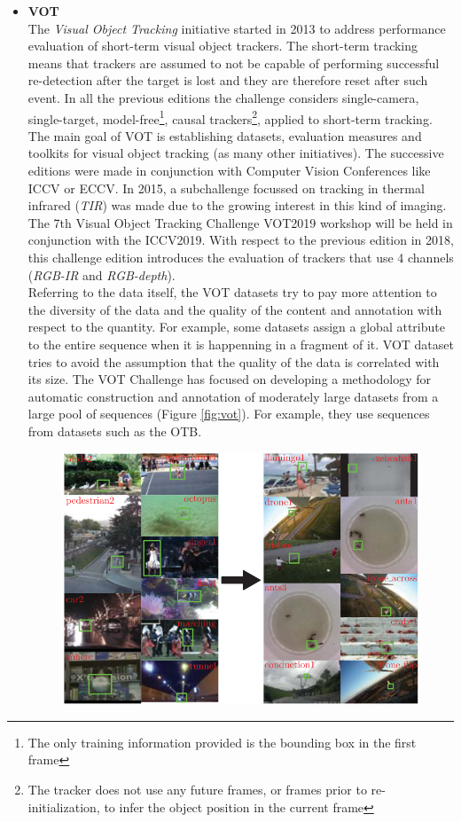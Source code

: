 \begin{itemize}
\item \textbf{VOT} \cite{kristan2017visual}\\
The \textit{Visual Object Tracking} initiative started in 2013 to address performance evaluation of short-term visual object trackers. The short-term tracking means that trackers are assumed to not be capable of performing successful re-detection after the target is lost and they are therefore reset after such event. In all the previous editions the challenge considers single-camera, single-target, model-free\footnote{The only training information provided is the bounding box in the first frame}, causal trackers\footnote{The tracker does not use any future frames, or frames prior to re-initialization, to infer the object position in the current frame}, applied to short-term tracking. The main goal of VOT is establishing datasets, evaluation measures and toolkits for visual object tracking (as many other initiatives). The successive editions were made in conjunction with Computer Vision Conferences like ICCV or ECCV. In 2015, a subchallenge focussed on tracking in thermal infrared (\textit{TIR}) was made due to the growing interest in this kind of imaging. The 7th Visual Object Tracking Challenge VOT2019 workshop will be held in conjunction with the ICCV2019. With respect to the previous edition in 2018, this challenge edition introduces the evaluation of trackers that use 4 channels (\textit{RGB-IR} and \textit{RGB-depth}).\\
Referring to the data itself, the VOT datasets try to pay more attention to the diversity of the data and the quality of the content and annotation with respect to the quantity. For example, some datasets assign a global attribute to the entire sequence when it is happenning in a fragment of it. VOT dataset tries to avoid the assumption that the quality of the data is correlated with its size. The VOT Challenge has focused on developing a methodology for automatic construction and annotation of moderately large datasets from a  large pool of sequences (Figure \ref{fig:vot}). For example, they use sequences from datasets such as the OTB.
\begin{figure}[H]
\begin{center}
\includegraphics[scale=0.3]{previous_version/vot.png}

\end{center}
\end{figure}
\end{itemize}
